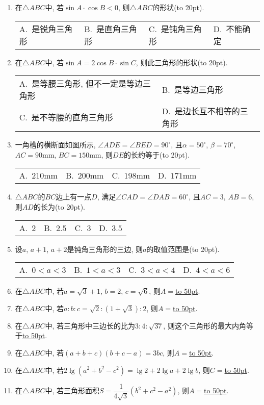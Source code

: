 \documentclass[10pt,a4paper]{article}
\newcommand{\blank}[1]{\underline{\hbox to #1pt{}}}
\newcommand{\bracket}[1]{(\hbox to #1pt{})}
\newcommand{\twoch}[4]{\par\begin{tabular}{p{.46\textwidth}p{.46\textwidth}}
A.~#1& B.~#2\\
C.~#3& D.~#4
\end{tabular}}
\newcommand{\fourch}[4]{\par\begin{tabular}{p{.23\textwidth}p{.23\textwidth}p{.23\textwidth}p{.23\textwidth}}
A.~#1 &B.~#2& C.~#3& D.~#4
\end{tabular}}
\begin{document}
\begin{enumerate}[1.]
\fourch{不等腰的锐角三角形}{直角三角形}{不等腰的钝角三角形}{等腰三角形}
\item 在$\triangle ABC$中, 若$\sin A\cdot \cos B<0$, 则$\triangle ABC$的形状\bracket{20}.
\fourch{是锐角三角形}{是直角三角形}{是钝角三角形}{不能确定}
\item 在$\triangle ABC$中, 若$\sin A=2\cos B\cdot \sin C$, 则此三角形的形状\bracket{20}.
\twoch{是等腰三角形, 但不一定是等边三角形}{是等边三角形}{是不等腰的直角三角形}{是边长互不相等的三角形}
\item 一角槽的横断面如图所示, $\angle ADE = \angle BED=90^\circ$, 且$\alpha =50^\circ$, $\beta =70^\circ$, $AC=90\text{mm}$, $BC=150\text{mm}$, 则$DE$的长约等于\bracket{20}.
\begin{center}
\end{center}
\fourch{$210\text{mm}$}{$200\text{mm}$}{$198\text{mm}$}{$171\text{mm}$}
\item $\triangle ABC$的$BC$边上有一点$D$, 满足$\angle CAD=\angle DAB=60^{\circ}$, 且$AC=3$, $AB=6$, 则$AD$的长为\bracket{20}.
\fourch{$2$}{$2.5$}{$3$}{$3.5$}
\item 设$a$, $a+1$, $a+2$是钝角三角形的三边, 则$a$的取值范围是\bracket{20}.
\fourch{$0<a<3$}{$1<a<3$}{$3<a<4$}{$4<a<6$}
\item 在$\triangle ABC$中, 若$a=\sqrt 3+1$, $b=2$, $c=\sqrt 6$, 则$A=$\blank{50}.
\item 在$\triangle ABC$中, 若$a:b:c=\sqrt 2:(1+\sqrt 3):2$, 则$A=$\blank{50}.
\item 在$\triangle ABC$中, 若三角形中三边长的比为$3:4:\sqrt {37}$, 则这个三角形的最大内角等于\blank{50}.
\item 在$\triangle ABC$中, 若$(a+b+c)(b+c-a)=3bc$, 则$A=$\blank{50}.
\item 在$\triangle ABC$中, 若$2\lg (a^2+b^2-c^2)=\lg 2+2\lg a+2\lg b$, 则$C=$\blank{50}.
\item 在$\triangle ABC$中, 若三角形面积$S=\dfrac 1{4\sqrt 3}(b^2+c^2-a^2)$, 则$A=$\blank{50}.

\end{enumerate}
\end{document}
